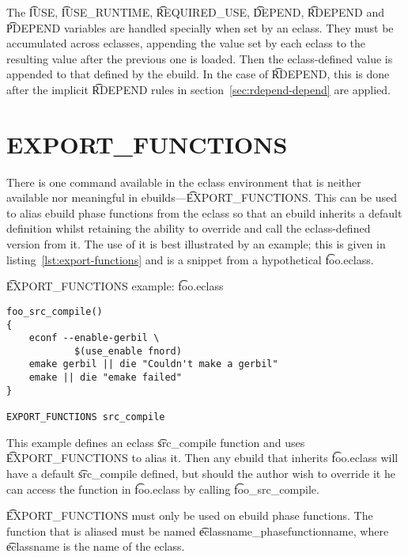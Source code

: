 The \t{IUSE}, \t{IUSE_RUNTIME}, \t{REQUIRED_USE}, \t{DEPEND}, \t{RDEPEND} and \t{PDEPEND} variables
are handled specially when set by an eclass. They must be accumulated across eclasses, appending
the value set by each eclass to the resulting value after the previous one is loaded. Then the
eclass-defined value is appended to that defined by the ebuild. In the case of \t{RDEPEND}, this
is done after the implicit \t{RDEPEND} rules in section~\ref{sec:rdepend-depend} are applied.

\section{EXPORT_FUNCTIONS}

There is one command available in the eclass environment that is neither available nor meaningful
in ebuilds---\t{EXPORT_FUNCTIONS}\@. This can be used to alias ebuild phase functions from the
eclass so that an ebuild inherits a default definition whilst retaining the ability to override and
call the eclass-defined version from it. The use of it is best illustrated by an example; this is
given in listing~\ref{lst:export-functions} and is a snippet from a hypothetical \t{foo.eclass}.

\begin{listing}
\caption{\t{EXPORT_FUNCTIONS} example: \t{foo.eclass}} \label{lst:export-functions}
\begin{verbatim}
foo_src_compile()
{
    econf --enable-gerbil \
            $(use_enable fnord)
    emake gerbil || die "Couldn't make a gerbil"
    emake || die "emake failed"
}

EXPORT_FUNCTIONS src_compile
\end{verbatim}
\end{listing}

This example defines an eclass \t{src_compile} function and uses \t{EXPORT_FUNCTIONS} to alias
it. Then any ebuild that inherits \t{foo.eclass} will have a default \t{src_compile} defined, but
should the author wish to override it he can access the function in \t{foo.eclass} by calling
\t{foo_src_compile}.

\t{EXPORT_FUNCTIONS} must only be used on ebuild phase functions. The function that is aliased
must be named \t{eclassname_phasefunctionname}, where \t{eclassname} is the name of the eclass.


